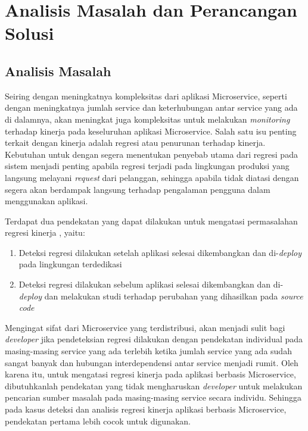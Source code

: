 \chapter{Analisis Masalah dan Perancangan Solusi}


\section{Analisis Masalah}
\label{analisis-masalah}

Seiring dengan meningkatnya kompleksitas dari aplikasi Microservice, seperti dengan meningkatnya jumlah service dan keterhubungan antar service yang ada di dalamnya, akan meningkat juga kompleksitas untuk melakukan \textit{monitoring} terhadap kinerja pada keseluruhan aplikasi Microservice. Salah satu isu penting terkait dengan kinerja adalah regresi atau penurunan terhadap kinerja. Kebutuhan untuk dengan segera menentukan penyebab utama dari regresi pada sistem menjadi penting apabila regresi terjadi pada lingkungan produksi yang langsung melayani \textit{request} dari pelanggan, sehingga apabila tidak diatasi dengan segera akan berdampak langsung terhadap pengalaman pengguna dalam menggunakan aplikasi. 

Terdapat dua pendekatan yang dapat dilakukan untuk mengatasi permasalahan regresi kinerja \citep{regression-detection}, yaitu:
\begin{enumerate}
	\item Deteksi regresi dilakukan setelah aplikasi selesai dikembangkan dan di-\textit{deploy} pada lingkungan terdedikasi
	\item Deteksi regresi dilakukan sebelum aplikasi selesai dikembangkan dan di-\textit{deploy} dan melakukan studi terhadap perubahan yang dihasilkan pada \textit{source code}
\end{enumerate}  

Mengingat sifat dari Microservice yang terdistribusi, akan menjadi sulit bagi \textit{developer} jika pendeteksian regresi dilakukan dengan pendekatan individual pada masing-masing service yang ada terlebih ketika jumlah service yang ada sudah sangat banyak dan hubungan interdependensi antar service menjadi rumit. Oleh karena itu, untuk mengatasi regresi kinerja pada aplikasi berbasis Microservice, dibutuhkanlah pendekatan yang tidak mengharuskan \textit{developer} untuk melakukan pencarian sumber masalah pada masing-masing service secara individu. Sehingga pada kasus deteksi dan analisis regresi kinerja aplikasi berbasis Microservice, pendekatan pertama lebih cocok untuk digunakan.

